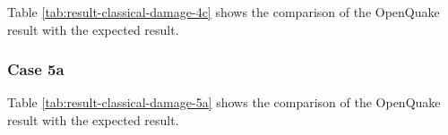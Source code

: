 

Table \ref{tab:result-classical-damage-4c} shows the comparison of the OpenQuake result with the expected result.

\subsubsection{Case 5a}




Table \ref{tab:result-classical-damage-5a} shows the comparison of the OpenQuake result with the expected result.
